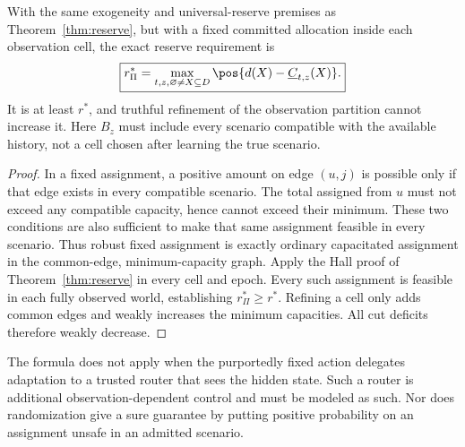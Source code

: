 \begin{theorem}
\label{thm:info-reserve}
With the same exogeneity and universal-reserve premises as Theorem~\ref{thm:reserve}, but with a fixed committed allocation inside each observation cell, the exact reserve requirement is
\begin{equation}
\boxed{r^*_{\Pi}=\max_{t,z,\varnothing\ne X\subseteq D}
\pos{d(X)-\underline C_{t,z}(X)}.}
\label{eq:info-reserve}
\end{equation}
It is at least $r^*$, and truthful refinement of the observation partition cannot increase it. Here $B_z$ must include every scenario compatible with the available history, not a cell chosen after learning the true scenario.
\end{theorem}
\begin{proof}
In a fixed assignment, a positive amount on edge $(u,j)$ is possible only if that edge exists in every compatible scenario. The total assigned from $u$ must not exceed any compatible capacity, hence cannot exceed their minimum. These two conditions are also sufficient to make that same assignment feasible in every scenario. Thus robust fixed assignment is exactly ordinary capacitated assignment in the common-edge, minimum-capacity graph. Apply the Hall proof of Theorem~\ref{thm:reserve} in every cell and epoch. Every such assignment is feasible in each fully observed world, establishing $r^*_{\Pi}\geq r^*$. Refining a cell only adds common edges and weakly increases the minimum capacities. All cut deficits therefore weakly decrease.
\end{proof}
The formula does not apply when the purportedly fixed action delegates adaptation to a trusted router that sees the hidden state. Such a router is additional observation-dependent control and must be modeled as such. Nor does randomization give a sure guarantee by putting positive probability on an assignment unsafe in an admitted scenario.

